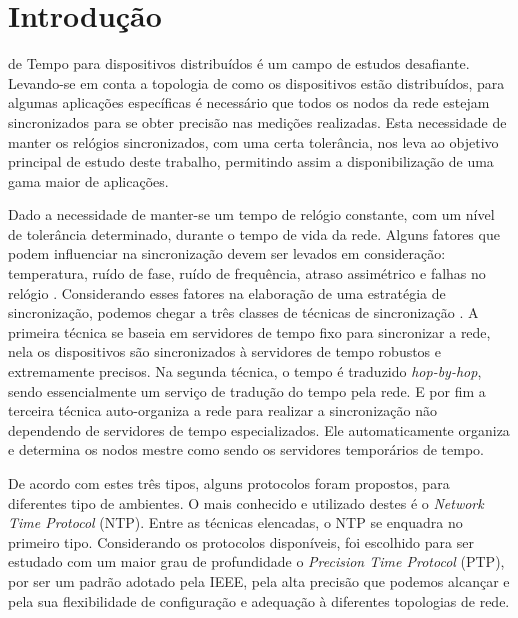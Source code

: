 \section{Introdução} \label{intro}

 de Tempo para dispositivos distribuídos é um campo de estudos desafiante. Levando-se em conta a topologia de como os dispositivos estão distribuídos, para algumas aplicações específicas é necessário que todos os nodos da rede estejam sincronizados  para se obter precisão nas medições realizadas. Esta necessidade de manter os relógios sincronizados, com uma certa tolerância, nos leva ao objetivo principal de estudo deste trabalho, permitindo assim a disponibilização de uma gama maior de aplicações. 
		
		Dado a necessidade de manter-se um tempo de relógio constante, com um nível de tolerância determinado, durante o tempo de vida da rede. Alguns fatores que podem influenciar na sincronização devem ser levados em consideração: temperatura, ruído de fase, ruído de frequência, atraso assimétrico e falhas no relógio \cite{Raton}. Considerando esses fatores na elaboração de uma estratégia de sincronização, podemos chegar a três classes de técnicas de sincronização \cite{Raton}. A primeira técnica se baseia em servidores de tempo fixo para sincronizar a rede, nela os dispositivos são sincronizados à servidores de tempo robustos e extremamente precisos. Na segunda técnica, o tempo é traduzido {\it hop-by-hop}, sendo essencialmente um serviço de tradução do tempo pela rede. E por fim a terceira técnica auto-organiza a rede para realizar a sincronização não dependendo de servidores de tempo especializados. Ele automaticamente organiza e determina os nodos mestre como sendo os servidores temporários de tempo.
        
        De acordo com estes três tipos, alguns protocolos foram propostos, para diferentes tipo de ambientes. O mais conhecido e utilizado destes é o {\it Network Time Protocol} (NTP). Entre as técnicas elencadas, o NTP se enquadra no primeiro tipo. Considerando os protocolos disponíveis, foi escolhido para ser estudado com um maior grau de profundidade o {\it Precision Time Protocol} (PTP), por ser um padrão adotado pela IEEE, pela alta precisão que podemos alcançar e pela sua flexibilidade de configuração e adequação à diferentes topologias de rede.
		
